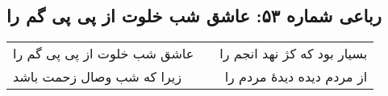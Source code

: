 \begin{center}
\section*{رباعی شماره ۵۳: عاشق شب خلوت از پی پی گم را}
\label{sec:0053}
\begin{longtable}{l p{0.5cm} r}
عاشق شب خلوت از پی پی گم را
&&
بسیار بود که کژ نهد انجم را
\\
زیرا که شب وصال زحمت باشد
&&
از مردم دیده دیدهٔ مردم را
\\
\end{longtable}
\end{center}
